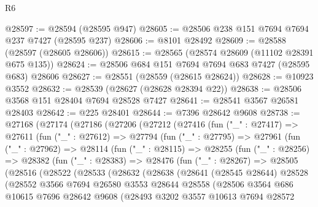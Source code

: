 \begin{lexlean}{R6}
\begin{coremodule}
@28597 := @28594 (@28595 @947)
@28605 := @28506 @238 @151 @7694 @7694 @237 @7427 (@28595 @237)
@28606 := @8101 @28492
@28609 := @28588 (@28597 (@28605 @28606))
@28615 := @28565 (@28574 @28609 (@11102 @28391 @675 @135))
@28624 := @28506 @684 @151 @7694 @7694 @683 @7427 (@28595 @683) @28606
@28627 := @28551 (@28559 (@28615 @28624))
@28628 := @10923 @3552
@28632 := @28539 (@28627 (@28628 @28394 @22))
@28638 := @28506 @3568 @151 @28404 @7694 @28528 @7427
@28641 := @28541 @3567 @26581 @28403
@28642 := @225 @28401
@28644 := @7396 @28642 @9608
@28738 := @27168
    (@27174
      (@27186
        (@27206
          (@27212
            (@27416
              (fun ("_" : @27417) =>
              @27611
                (fun ("_" : @27612) =>
                @27794
                  (fun ("_" : @27795) =>
                  @27961
                    (fun ("_" : @27962) =>
                    @28114
                      (fun ("_" : @28115) =>
                      @28255
                        (fun ("_" : @28256) =>
                        @28382
                          (fun ("_" : @28383) =>
                          @28476
                            (fun ("_" : @28267) =>
                            @28505
                              (@28516
                                (@28522
                                  (@28533
                                    (@28632
                                      (@28638
                                        (@28641
                                          (@28545 @28644)
                                          @28528
                                          (@28552
                                            @3566
                                            @7694
                                            @26580
                                            @3553
                                            @28644
                                            @28558
                                            (@28506
                                              @3564
                                              @686
                                              @10615
                                              @7696
                                              @28642
                                              @9608
                                              (@28493
                                                @3202
                                                @3557
                                                @10613
                                                @7694
                                                @28572

\end{coremodule}
\end{lexlean}
